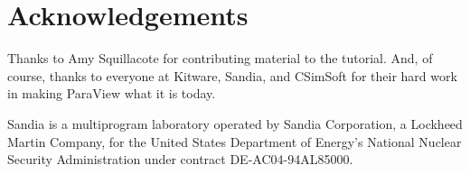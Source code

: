 \documentclass[@GLOBAL_OPTIONS@]{book}
\begin{document}
\tableofcontents

\listofexercise

\mainmatter











\backmatter

\chapter{Acknowledgements}

Thanks to Amy Squillacote for contributing material to the tutorial.  And,
of course, thanks to everyone at Kitware, Sandia, and CSimSoft for their
hard work in making ParaView what it is today.

Sandia is a multiprogram laboratory operated by Sandia Corporation, a
Lockheed Martin Company, for the United States Department of Energy's
National Nuclear Security Administration under contract DE-AC04-94AL85000.

\clearpage
{}
{}
\printindex
\end{document}
